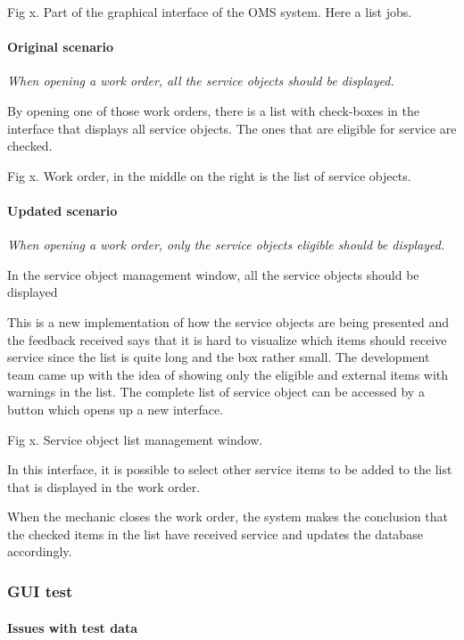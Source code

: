 \documentclass{article}
\begin{document}
		Fig x. Part of the graphical interface of the OMS system. Here a list jobs.

			\paragraph{Original scenario}
			{\em When opening a work order, all the service objects should be displayed.}

			By opening one of those work orders, there is a list with check-boxes in the interface that displays all service objects. The ones that are eligible for service are checked.

			Fig x. Work order, in the middle on the right is the list of service objects.

			\paragraph{Updated scenario}
			{\em When opening a work order, only the service objects eligible should be displayed.}

			In the service object management window, all the service objects should be displayed
			
			This is a new implementation of how the service objects are being presented and the feedback received says that it is hard to visualize which items should receive service since the list is quite long and the box rather small. The development team came up with the idea of showing only the eligible and external items with warnings in the list. The complete list of service object can be accessed by a button which opens up a new interface.

			Fig x. Service object list management window.

			In this interface, it is possible to select other service items to be added to the list that is displayed in the work order.

			When the mechanic closes the work order, the system makes the conclusion that the checked items in the list have received service and updates the database accordingly.


			\subsubsection{GUI test}


				\paragraph{Issues with test data}
				
\end{document}
